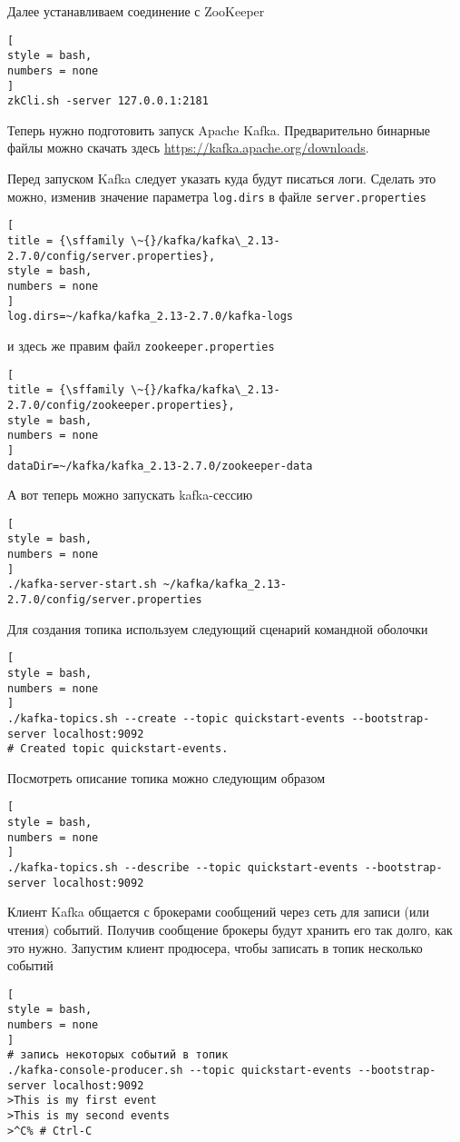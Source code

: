 \documentclass[%
	11pt,
	a4paper,
	utf8,
		]{article}
\begin{document}
Далее устанавливаем соединение с ZooKeeper
\begin{lstlisting}[
style = bash,
numbers = none	
]
zkCli.sh -server 127.0.0.1:2181
\end{lstlisting}

Теперь нужно подготовить запуск Apache Kafka. Предварительно бинарные файлы можно скачать здесь \url{https://kafka.apache.org/downloads}.

Перед запуском Kafka следует указать куда будут писаться логи. Сделать это можно, изменив значение параметра \texttt{log.dirs} в файле \texttt{server.properties}
\begin{lstlisting}[
title = {\sffamily \~{}/kafka/kafka\_2.13-2.7.0/config/server.properties},
style = bash,
numbers = none
]
log.dirs=~/kafka/kafka_2.13-2.7.0/kafka-logs
\end{lstlisting}
и здесь же правим файл \texttt{zookeeper.properties}
\begin{lstlisting}[
title = {\sffamily \~{}/kafka/kafka\_2.13-2.7.0/config/zookeeper.properties},
style = bash,
numbers = none	
]
dataDir=~/kafka/kafka_2.13-2.7.0/zookeeper-data
\end{lstlisting}

А вот теперь можно запускать kafka-сессию
\begin{lstlisting}[
style = bash,
numbers = none	
]
./kafka-server-start.sh ~/kafka/kafka_2.13-2.7.0/config/server.properties
\end{lstlisting}

Для создания топика используем следующий сценарий командной оболочки
\begin{lstlisting}[
style = bash,
numbers = none	
]
./kafka-topics.sh --create --topic quickstart-events --bootstrap-server localhost:9092
# Created topic quickstart-events.
\end{lstlisting}

Посмотреть описание топика можно следующим образом
\begin{lstlisting}[
style = bash,
numbers = none	
]
./kafka-topics.sh --describe --topic quickstart-events --bootstrap-server localhost:9092
\end{lstlisting}

Клиент Kafka общается с брокерами сообщений через сеть для записи (или чтения) событий. Получив сообщение брокеры будут хранить его так долго, как это нужно. Запустим клиент продюсера, чтобы записать в топик несколько событий
\begin{lstlisting}[
style = bash,
numbers = none	
]
# запись некоторых событий в топик
./kafka-console-producer.sh --topic quickstart-events --bootstrap-server localhost:9092
>This is my first event
>This is my second events
>^C% # Ctrl-C
\end{lstlisting}
\end{document}
